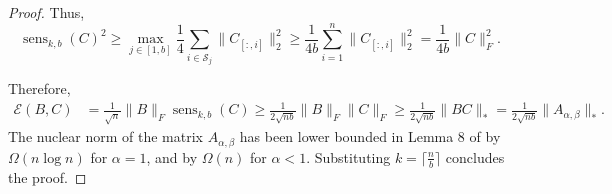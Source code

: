 \documentclass{article} %
\newcommand{\senskb}{\operatorname{sens}_{k, b}}
\begin{document}
\begin{proof}
    Thus,
    \begin{equation}
        \senskb(C)^2 \ge \max_{j \in [1, b]} \frac{1}{4} \sum_{i \in \mathcal{S}_j} \|C_{[:, i]}\|_2^2 \ge \frac{1}{4b} \sum_{i = 1}^{n} \|C_{[:, i]}\|_2^2 = \frac{1}{4b} \|C\|_F^2.
    \end{equation}

Therefore,
\begin{equation}
\begin{aligned}
    \mathcal{E}(B, C) &= \frac{1}{\sqrt{n}} \|B\|_F \senskb(C) 
    \ge \frac{1}{2\sqrt{nb}} \|B\|_F \|C\|_F 
    \ge \frac{1}{2\sqrt{nb}} \|BC\|_* = \frac{1}{2\sqrt{nb}} \|A_{\alpha, \beta}\|_*.
\end{aligned}
\end{equation}
The nuclear norm of the matrix $A_{\alpha, \beta}$ has been lower bounded in Lemma 8 of \citet{kalinin2024} by $\Omega(n \log n)$ for $\alpha = 1$, and by $\Omega(n)$ for $\alpha < 1$. Substituting $k = \lceil \frac{n}{b} \rceil$ concludes the proof.
\end{proof}
\end{document}
